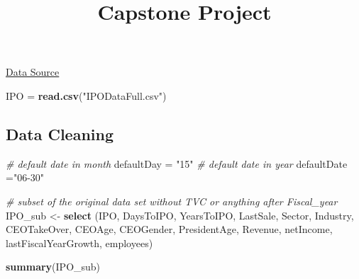 \documentclass[]{article}
\title{Capstone Project}
\author{}
\date{\vspace{-2.5em}}
\newenvironment{Shaded}{\begin{snugshade}}{\end{snugshade}}
\newcommand{\CommentTok}[1]{\textcolor[rgb]{0.56,0.35,0.01}{\textit{#1}}}
\newcommand{\KeywordTok}[1]{\textcolor[rgb]{0.13,0.29,0.53}{\textbf{#1}}}
\newcommand{\NormalTok}[1]{#1}
\newcommand{\OperatorTok}[1]{\textcolor[rgb]{0.81,0.36,0.00}{\textbf{#1}}}
\newcommand{\StringTok}[1]{\textcolor[rgb]{0.31,0.60,0.02}{#1}}
\begin{document}
\maketitle

\href{https://www.kaggle.com/proselotis/financial-ipo-data}{Data Source}

\begin{Shaded}
\begin{Highlighting}[]
\NormalTok{IPO =}\StringTok{ }\KeywordTok{read.csv}\NormalTok{(}\StringTok{"IPODataFull.csv"}\NormalTok{)}
\end{Highlighting}
\end{Shaded}

\hypertarget{data-cleaning}{%
\subsection{Data Cleaning}\label{data-cleaning}}

\begin{Shaded}
\begin{Highlighting}[]
\CommentTok{# default date in month}
\NormalTok{defaultDay =}\StringTok{ "15"}
\CommentTok{# default date in year}
\NormalTok{defaultDate =}\StringTok{"06-30"}
\end{Highlighting}
\end{Shaded}

\begin{Shaded}
\end{Shaded}

\begin{Shaded}
\begin{Highlighting}[]
\CommentTok{# subset of the original data set without TVC or anything after Fiscal_year}
\NormalTok{IPO_sub <-}\StringTok{ }\KeywordTok{select}\NormalTok{ (IPO, DaysToIPO, YearsToIPO, LastSale, Sector, Industry, CEOTakeOver, CEOAge, CEOGender, PresidentAge, Revenue, netIncome, lastFiscalYearGrowth, employees)}
\end{Highlighting}
\end{Shaded}

\begin{Shaded}
\begin{Highlighting}[]
\KeywordTok{summary}\NormalTok{(IPO_sub)}
\end{Highlighting}
\end{Shaded}
\end{document}
